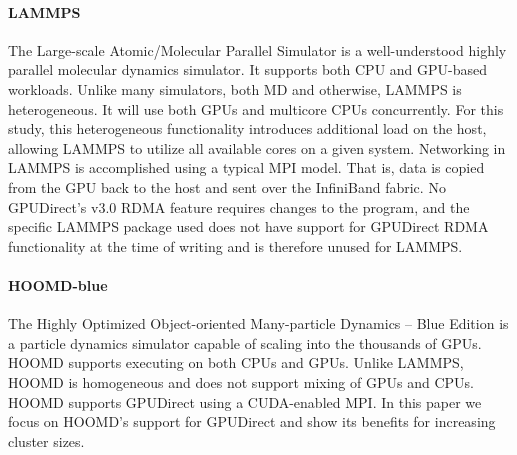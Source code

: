 \paragraph {LAMMPS} The Large-scale Atomic/Molecular Parallel Simulator is a
well-understood highly parallel molecular dynamics simulator.  It supports both
CPU and GPU-based workloads.  Unlike many simulators, both MD and otherwise,
LAMMPS is heterogeneous.  It will use both GPUs and multicore CPUs concurrently.
For this study, this heterogeneous functionality introduces additional load on
the host, allowing LAMMPS to utilize all available cores on a given system.
Networking in LAMMPS is accomplished using a typical MPI model. That is, data is
copied from the GPU back to the host and sent over the InfiniBand fabric.  No
GPUDirect’s v3.0 RDMA feature requires changes to the program, and the specific LAMMPS package used does not have support for GPUDirect RDMA functionality at the time of writing and is therefore unused for LAMMPS. 

\paragraph{HOOMD-blue} The Highly Optimized Object-oriented Many-particle
Dynamics -- Blue Edition is a particle dynamics simulator capable of
scaling into the thousands of GPUs.  HOOMD supports executing on both CPUs and
GPUs.  Unlike LAMMPS, HOOMD is homogeneous and does not support mixing
of GPUs and CPUs.  HOOMD supports GPUDirect using a CUDA-enabled MPI.
In this paper we focus on HOOMD's
support for GPUDirect and show its benefits for increasing cluster sizes.  


